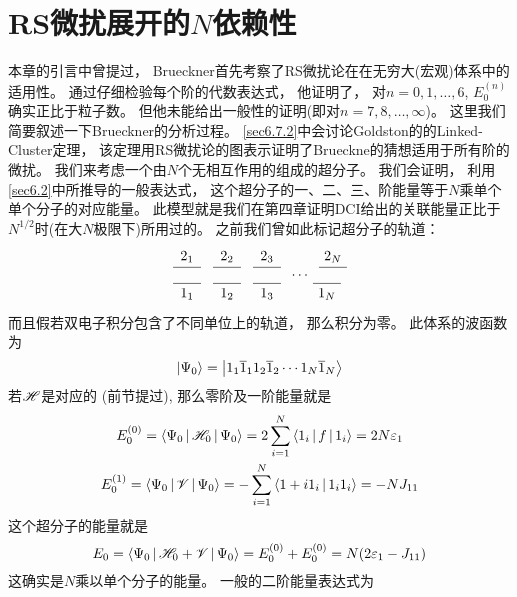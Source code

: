 \section{RS微扰展开的$N$依赖性}
本章的引言中曾提过， 
Brueckner首先考察了RS微扰论在在无穷大(宏观)体系中的适用性。
通过仔细检验每个阶的代数表达式，
他证明了，
对$n=0,1,\ldots,6$, 
$E_0^{(n)}$确实正比于粒子数。
但他未能给出一般性的证明(即对$n=7,8,\ldots,\infty$)。 
这里我们简要叙述一下Brueckner的分析过程。
\autoref{sec6.7.2}中会讨论Goldston的的Linked-Cluster定理，
该定理用RS微扰论的图表示证明了Brueckne的猜想适用于所有阶的微扰。
我们来考虑一个由$N$个无相互作用的组成的超分子。
我们会证明，
利用\autoref{sec6.2}中所推导的一般表达式，
这个超分子的一、二、三、阶能量等于$N$乘单个单个分子的对应能量。
此模型就是我们在第四章证明DCI给出的关联能量正比于$N^{1/2}$时(在大$N$极限下)所用过的。
之前我们曾如此标记超分子的轨道：
\begin{equation*}
\begin{tikzpicture}
\draw (0,0)--node[below]{$1_1$}++(0.7,0) ++(0.3,0)--node[below]{$1_2$}++(0.7,0) ++(0.3,0)--node[below]{$1_3$}++(0.7,0) ++(0.5,0.2) node{$\cdots$} +(.5,0) ++(0.3,-.2)--node[below]{$1_N$}++(0.7,0);

\draw (0,.4)--node[above]{$2_1$}++(0.7,0) ++(0.3,0)--node[above]{$2_2$}++(0.7,0) ++(0.3,0)--node[above]{$2_3$}++(0.7,0) ++(0.65,0.2)  +(.35,0) ++(0.3,-.2)--node[above]{$2_N$}++(0.7,0);
\end{tikzpicture}
\end{equation*}
而且假若双电子积分包含了不同单位上的轨道，
那么积分为零。
此体系的\hft 波函数为
\begin{equation}
\Ket{\Psi_0} = \Ket{1_1\overline{1}_1 1_2\overline{1}_2 \cdots 1_N\overline{1}_N}
\end{equation}
若$\mathscr{H}$是对应的\hft{} \ha(前节提过), 
那么零阶及一阶能量就是
\begin{subequations}
\begin{gather}
E_0^{(0)} = \Braket{\Psi_0|\mathscr{H}_0|\Psi_0}=2\sum_{i=1}^{N}\Braket{1_i|f|1_i}=2N\varepsilon_1\\
E_0^{(1)} = \Braket{\Psi_0|\mathscr{V}|\Psi_0}=-\sum_{i=1}^{N}\Braket{1+i1_i|1_i1_i}=-NJ_{11}
\label{6.80b}
\end{gather}
\end{subequations}
这个超分子的\hft 能量就是
\begin{equation}
E_0=\Braket{\Psi_0|\mathscr{H}_0+\mathscr{V}|\Psi_0} = E_0^{(0)} + E_0^{(0)} = N(2\varepsilon_1-J_{11})
\end{equation}
这确实是$N$乘以单个分子的\hft 能量。
一般的二阶能量表达式为
